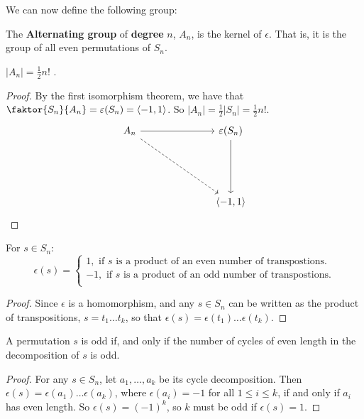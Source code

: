 We can now define the following group:

\begin{definition}
  The \textbf{Alternating group} of \textbf{degree} $n$,  $A_n$, is the kernel
  of  $\epsilon$. That is, it is the group of all even permutations of $S_n$.
\end{definition}

\begin{proposition}\label{proposition_3.6.4}
  $|A_n|=\frac{1}{2}n!$ .
\end{proposition}
\begin{proof}
  By the first isomorphism theorem, we have that
  $\faktor{S_n}{A_n}=\epsilon(S_n)=\langle -1 ,1 \rangle$. So
  $|A_n|=\frac{1}{2}|S_n|=\frac{1}{2}n!$.
  \[\begin{tikzcd}
    {A_n} &&& {\epsilon(S_n)} \\
    \\
    \\
          &&& {\langle -1, 1 \rangle}
          \arrow[from=1-1, to=1-4]
          \arrow[from=1-4, to=4-4]
          \arrow[dashed, from=1-1, to=4-4]
  \end{tikzcd}\]
\end{proof}
\begin{corollary}
  For $s \in S_n$:
  \begin{equation*}
    \epsilon(s)=\begin{cases}
      1, \text{ if } s \text{ is a product of an even number of
      transpostions.} \\
      -1, \text{ if } s \text{ is a product of an odd number of
      transpostions.} \\
    \end{cases}
  \end{equation*}
\end{corollary}
\begin{proof}
  Since $\epsilon$ is a homomorphism, and any $s \in S_n$ can be written as
  the product of transpositions, $s=t_1 \dots t_k$, so that
  $\epsilon(s)=\epsilon(t_1) \dots \epsilon(t_k)$.
\end{proof}

\begin{proposition}\label{proposition_3.6.5}
  A permutation $s$ is odd if, and only if the number of cycles of even length
  in the decomposition of $s$ is odd.
\end{proposition}
\begin{proof}
  For any $s \in S_n$, let  $a_1, \dots, a_k$ be its cycle decomposition. Then
  $\epsilon(s)=\epsilon(a_1) \dots \epsilon(a_k)$, where $\epsilon(a_i)=-1$
  for all $1 \leq i \leq k$, if and only if $a_i$ has even length. So
  $\epsilon(s)=(-1)^k$, so $k$ must be odd if  $\epsilon(s)=1$.
\end{proof}

